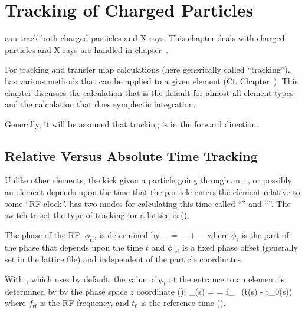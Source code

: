 \chapter{Tracking of Charged Particles}
\label{c:charged.track}

\bmad can track both charged particles and X-rays. This chapter deals
with charged particles and X-rays are handled in
chapter~.

For tracking and transfer map calculations (here generically called
``tracking''), \bmad has various methods that can be applied to a
given element (Cf. Chapter~). This chapter discusses
the  calculation that is the default for almost all
element types and the  calculation that does
symplectic integration.

Generally, it will be assumed that tracking is in the forward direction.

\section{Relative Versus Absolute Time Tracking}
\label{s:rf.time}

Unlike other elements, the kick given a particle going through an
, , or possibly an  element
depends upon the time that the particle enters the element relative to
some ``RF clock''. \bmad has two modes for calculating this time
called ``'' and ``''. The switch to set the type of tracking for a lattice is
 ().

The phase of the RF, $\phi_\text{rf}$, is determined by
\Begineq
  \phi_ = \phi_ + \phi_
\Endeq
where $\phi_\text{t}$ is the part of the phase that depends upon the time $t$ and $\phi_\text{ref}$
is a fixed phase offset (generally set in the lattice file) and independent of the particle
coordinates.

With , which \bmad uses by default, the value of $\phi_\text{t}$ at the
entrance to an element is determined by by the phase space $z$ coordinate ():
\Begineq
  \phi_(s) = 
  = f_ \, (t(s) - t_0(s))
\Endeq
where $f_\text{rf}$ is the RF frequency, and $t_0$ is the reference time ().

